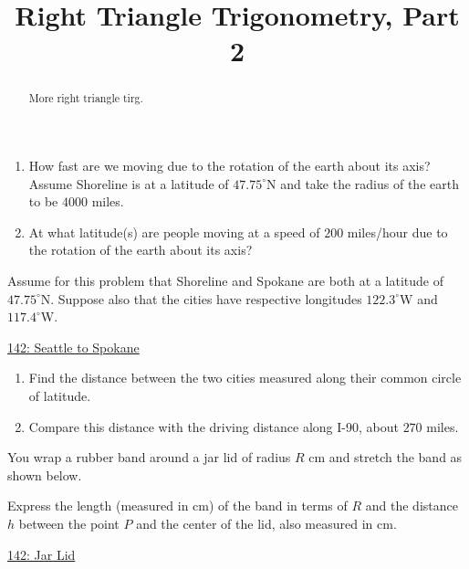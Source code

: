 \documentclass{ximera}
\title{Right Triangle Trigonometry, Part 2}
\begin{document}
\begin{abstract}
More right triangle tirg.
\end{abstract}
\maketitle



\begin{question} \label{Qfksadfsdt4e4}
\begin{enumerate}
\item How fast are we moving due to the rotation of the earth about its axis? Assume Shoreline is at a latitude of $47.75^\circ$N and take the radius of the earth to be $4000$ miles.

\item At what latitude(s) are people moving at a speed of $200$ miles/hour due to the rotation of the earth about its axis?
\end{enumerate}
\end{question}

\begin{question}  \label{QODfefEREr}
Assume for this problem that Shoreline and Spokane are both at a latitude of $47.75^\circ$N. Suppose also that the cities have respective longitudes $122.3^\circ$W and $117.4^\circ$W. 


\begin{onlineOnly}
    \begin{center}
\end{center}
\end{onlineOnly}

\href{https://www.desmos.com/3d/zedglsgp8s}{142: Seattle to Spokane}


\begin{enumerate}
\item Find the distance between the two cities measured along their common circle of latitude.

\item Compare this distance with the driving distance along I-90, about $270$ miles.

\end{enumerate}

\end{question}


\begin{question} \label{QdfRERER}
You wrap a rubber band around a jar lid of radius $R$ cm and stretch the band as shown below.

Express the length (measured in cm) of the band in terms of $R$ and the distance $h$ between the point $P$ and the center of the lid, also measured in cm.


\begin{onlineOnly}
    \begin{center}
\end{center}
\end{onlineOnly}

\href{https://www.desmos.com/calculator/wz5qiyj4od}{142: Jar Lid}

\end{question}
\end{document}
